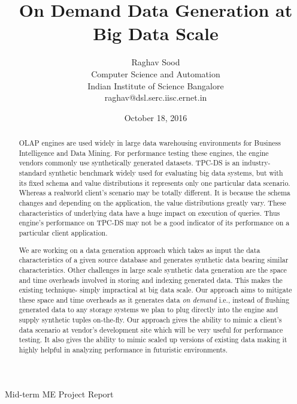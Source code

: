 \documentclass[]{article}
\title{\large \bf On Demand Data Generation at Big Data Scale}
\author{Raghav Sood \\ Computer Science and Automation \\ Indian Institute of Science Bangalore \\ raghav@dsl.serc.iisc.ernet.in}
\date{October 18, 2016}
\begin{document}
    \maketitle
    \begin{center}
        Mid-term ME Project Report
    \end{center}
        \vskip 12pt
	
	\begin{abstract}
		OLAP engines are used widely in large data warehousing environments for Business Intelligence and Data Mining. 
		For performance testing these engines, the engine vendors commonly use synthetically generated datasets. 
		TPC-DS \cite{tpcds} is an industry-standard synthetic benchmark widely used for evaluating big data systems, but with its fixed schema and value distributions it represents only one particular data scenario. 
		Whereas a realworld client's scenario may be totally different. 
		It is because the schema changes and depending on the application, the value distributions greatly vary. 
		These characteristics of underlying data have a huge impact on execution of queries. 
		Thus engine's performance on TPC-DS may not be a good indicator of its performance on a particular client application.

		We are working on a data generation approach which takes as input the data characteristics of a given source database and generates synthetic data bearing similar characteristics. 
		Other challenges in large scale synthetic data generation are the space and time overheads involved in storing and indexing generated data. 
		This makes the existing technique- \cite{arasu} simply impractical at big data scale. 
		Our approach aims to mitigate these space and time overheads as it generates data \textit{on demand} i.e., instead of flushing generated data to any storage systems we plan to plug directly into the engine and supply synthetic tuples on-the-fly. 
		Our approach gives the ability to mimic a client's data scenario at vendor's development site which will be very useful for performance testing.
		It also gives the ability to mimic scaled up versions of existing data making it highly helpful in analyzing performance in futuristic environments. 
	\end{abstract}	
	
	\hfill
	
\end{document}
